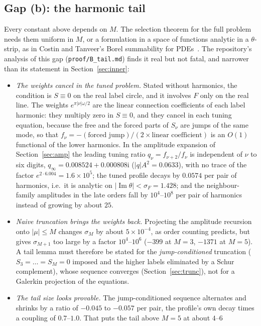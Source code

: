 \documentclass{amsart}
\numberwithin{equation}{section}
\theoremstyle{plain}
\theoremstyle{definition}
\theoremstyle{remark}
\newcommand{\im}{\operatorname{Im}}
\newcommand{\iu}{\mathrm{i}}
\newcommand{\repo}[1]{\texttt{#1}}
\begin{document}
\subsection{Gap (b): the harmonic tail}
\label{sec:tail}
Every constant above depends on $M$. The selection theorem for the full problem needs them uniform in $M$, or a
formulation in a space of functions analytic in a $\theta$-strip, as in Costin and Tanveer's Borel summability for
PDEs~\cite{CostinTanveer2007}. The repository's analysis of this gap (\repo{proof/B\_tail.md}) finds it real but not fatal,
and narrower than its statement in Section~\ref{sec:inner}:
\begin{itemize}
\item \emph{The weights cancel in the tuned problem.} Stated without harmonics, the condition is $S \equiv 0$ on the real
label circle, and it involves $F$ only on the real line. The weights $e^{\pi|\nu|\omega/2}$ are the linear connection
coefficients of each label harmonic: they multiply zero in $S \equiv 0$, and they cancel in each tuning equation, because the
free and the forced parts of $S_\nu$ are jumps of the same mode, so that $f_\nu = -(\text{forced jump})/(2\times\text{linear
coefficient})$ is an $O(1)$ functional of the lower harmonics. In the amplitude expansion of Section~\ref{sec:amp} the
leading tuning ratio $q_\nu = f_{\nu+2}/f_\nu$ is independent of $\nu$ to six digits, $q_\infty = 0.008524 + 0.000808\iu$
($|q|A^2 = 0.0633$), with no trace of the factor $e^{2\cdot6.004} = 1.6\times10^5$; the tuned profile decays by $0.0574$ per pair
of harmonics, i.e.\ it is analytic on $|\im\theta| < \sigma_F = 1.428$; and the neighbour-family amplitudes in the late orders
fall by $10^4$--$10^8$ per pair of harmonics instead of growing by about $25$.
\item \emph{Naive truncation brings the weights back.} Projecting the amplitude recursion onto $|\mu| \le M$ changes $\sigma_M$
by about $5\times10^{-4}$, as order counting predicts, but gives $\sigma_{M+1}$ too large by a factor $10^4$--$10^6$ ($-399$ at
$M = 3$, $-1371$ at $M = 5$). A tail lemma must therefore be stated for the \emph{jump-conditioned} truncation ($S_3 = \dots = S_M = 0$
imposed and the higher labels eliminated by a Schur complement), whose sequence converges (Section~\ref{sec:trunc}), not for a
Galerkin projection of the equations.
\item \emph{The tail size looks provable.} The jump-conditioned sequence alternates and shrinks by a ratio of $-0.045$ to
$-0.057$ per pair, the profile's own decay times a coupling of $0.7$--$1.0$. That puts the tail above $M = 5$ at about $4$--$6$

\end{itemize}
\end{document}
